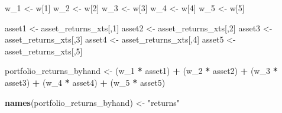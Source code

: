 \documentclass[]{krantz}
\makeatletter
\newenvironment{Shaded}{\begin{snugshade}}{\end{snugshade}}
\newcommand{\KeywordTok}[1]{\textcolor[rgb]{0.13,0.29,0.53}{\textbf{#1}}}
\newcommand{\DataTypeTok}[1]{\textcolor[rgb]{0.13,0.29,0.53}{#1}}
\newcommand{\DecValTok}[1]{\textcolor[rgb]{0.00,0.00,0.81}{#1}}
\newcommand{\StringTok}[1]{\textcolor[rgb]{0.31,0.60,0.02}{#1}}
\newcommand{\OperatorTok}[1]{\textcolor[rgb]{0.81,0.36,0.00}{\textbf{#1}}}
\newcommand{\NormalTok}[1]{#1}
\newenvironment{kframe}{%
\medskip{}
\setlength{\fboxsep}{.8em}
 \def\at@end@of@kframe{}%
 \ifinner\ifhmode%
  \def\at@end@of@kframe{\end{minipage}}%
  \begin{minipage}{\columnwidth}%
 \fi\fi%
 \def\FrameCommand##1{\hskip\@totalleftmargin \hskip-\fboxsep
 \colorbox{shadecolor}{##1}\hskip-\fboxsep
     \hskip-\linewidth \hskip-\@totalleftmargin \hskip\columnwidth}%
 \MakeFramed {\advance\hsize-\width
   \@totalleftmargin\z@ \linewidth\hsize
   \@setminipage}}%
 {\par\unskip\endMakeFramed%
 \at@end@of@kframe}
\renewenvironment{Shaded}{\begin{kframe}}{\end{kframe}}
\makeatother
\begin{document}
\begin{Shaded}
\begin{Highlighting}[]
\NormalTok{w_}\DecValTok{1}\NormalTok{ <-}\StringTok{ }\NormalTok{w[}\DecValTok{1}\NormalTok{]}
\NormalTok{w_}\DecValTok{2}\NormalTok{ <-}\StringTok{ }\NormalTok{w[}\DecValTok{2}\NormalTok{]}
\NormalTok{w_}\DecValTok{3}\NormalTok{ <-}\StringTok{ }\NormalTok{w[}\DecValTok{3}\NormalTok{]}
\NormalTok{w_}\DecValTok{4}\NormalTok{ <-}\StringTok{ }\NormalTok{w[}\DecValTok{4}\NormalTok{]}
\NormalTok{w_}\DecValTok{5}\NormalTok{ <-}\StringTok{ }\NormalTok{w[}\DecValTok{5}\NormalTok{]}

\NormalTok{asset1 <-}\StringTok{ }\NormalTok{asset_returns_xts[,}\DecValTok{1}\NormalTok{]}
\NormalTok{asset2 <-}\StringTok{ }\NormalTok{asset_returns_xts[,}\DecValTok{2}\NormalTok{]}
\NormalTok{asset3 <-}\StringTok{ }\NormalTok{asset_returns_xts[,}\DecValTok{3}\NormalTok{]}
\NormalTok{asset4 <-}\StringTok{ }\NormalTok{asset_returns_xts[,}\DecValTok{4}\NormalTok{]}
\NormalTok{asset5 <-}\StringTok{ }\NormalTok{asset_returns_xts[,}\DecValTok{5}\NormalTok{]}

\NormalTok{portfolio_returns_byhand <-}\StringTok{   }
\StringTok{  }\NormalTok{(w_}\DecValTok{1} \OperatorTok{*}\StringTok{ }\NormalTok{asset1) }\OperatorTok{+}\StringTok{ }
\StringTok{  }\NormalTok{(w_}\DecValTok{2} \OperatorTok{*}\StringTok{ }\NormalTok{asset2) }\OperatorTok{+}\StringTok{ }
\StringTok{  }\NormalTok{(w_}\DecValTok{3} \OperatorTok{*}\StringTok{ }\NormalTok{asset3) }\OperatorTok{+}
\StringTok{  }\NormalTok{(w_}\DecValTok{4} \OperatorTok{*}\StringTok{ }\NormalTok{asset4) }\OperatorTok{+}\StringTok{ }
\StringTok{  }\NormalTok{(w_}\DecValTok{5} \OperatorTok{*}\StringTok{ }\NormalTok{asset5)}

\KeywordTok{names}\NormalTok{(portfolio_returns_byhand) <-}\StringTok{ "returns"}
\end{Highlighting}
\end{Shaded}

\begin{Shaded}
\end{Shaded}
\end{document}
